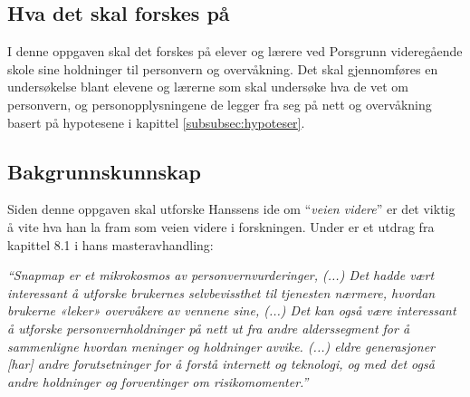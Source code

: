 \subsection{Hva det skal forskes på}
I denne oppgaven skal det forskes på elever og lærere ved Porsgrunn videregående skole sine holdninger til personvern og overvåkning. Det skal gjennomføres en undersøkelse blant elevene og lærerne som skal undersøke hva de vet om personvern, og personopplysningene de legger fra seg på nett og overvåkning basert på hypotesene i kapittel \ref{subsubsec:hypoteser}.

\subsection{Bakgrunnskunnskap}
Siden denne oppgaven skal utforske Hanssens ide om ``\textit{veien videre}'' er det viktig å vite hva han la fram som veien videre i forskningen. Under er et utdrag fra kapittel 8.1 i hans masteravhandling:

\textit{``Snapmap er et mikrokosmos av personvernvurderinger, (...) Det hadde vært interessant å utforske brukernes selvbevissthet til tjenesten nærmere, hvordan brukerne «leker» overvåkere av vennene sine, (...) Det kan også være interessant å utforske personvernholdninger på nett ut fra andre alderssegment for å sammenligne hvordan meninger og holdninger avvike. (...) eldre generasjoner [har] andre forutsetninger for å forstå internett og teknologi, og med det også andre holdninger og forventinger om risikomomenter.''} \parencite[69]{master:hanssen}

\newpage